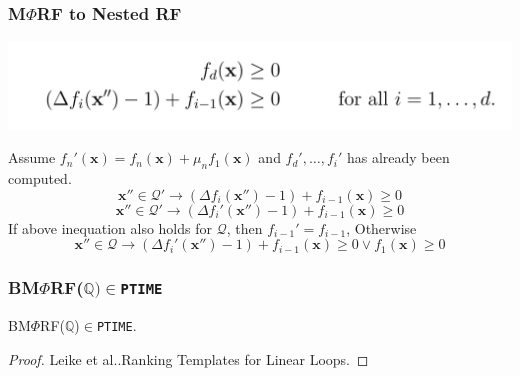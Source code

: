 \documentclass[11pt]{beamer}
\begin{document}
\begin{frame}\frametitle{M$\Phi$RF to Nested RF}
\begin{center}
\includegraphics[scale = 0.2]{6.PNG}
\end{center}

Assume $f_{n}'(\textbf{x})= f_{n}(\textbf{x}) + \mu_{n}f_1(\textbf{x})$ and $f_d', \ldots, f_{i}'$ has already been computed.
\[\textbf{x}''\in \mathcal{Q}' \rightarrow (\Delta f_i(\textbf{x}'') - 1) + f_{i-1}(\textbf{x}) \ge 0\]
\[\textbf{x}''\in \mathcal{Q}' \rightarrow (\Delta f_i'(\textbf{x}'') - 1) + f_{i-1}(\textbf{x}) \ge 0\]
If above inequation also holds for $\mathcal{Q}$, then $f_{i-1}' = f_{i-1}$, Otherwise
\[\textbf{x}''\in \mathcal{Q} \rightarrow (\Delta f_i'(\textbf{x}'') - 1) + f_{i-1}(\textbf{x}) \ge 0 \vee f_1(\textbf{x}) \ge 0\]


\end{frame}

\begin{frame}\frametitle{BM$\Phi$RF($\mathbb{Q})\in$\texttt{PTIME}}
\begin{theorem}[2]
BM$\Phi$RF($\mathbb{Q}$)$\in$\texttt{PTIME}.



\end{theorem}

\begin{proof}
Leike et al..Ranking Templates for Linear Loops. 

\end{proof}
\end{frame}
\end{document}
